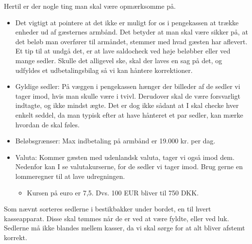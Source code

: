 Hertil er der nogle ting man skal være opmærksomme på.
\begin{itemize}
  \item Det vigtigt at pointere at det ikke er muligt for 
  os i pengekassen at trække enheder ud af gæsternes armbånd.
  Det betyder at man skal være sikker på, at det beløb man overfører til armåndet, 
  stemmer med hvad gæsten har aflevert. Et tip til at undgå det, er
  at lave saldocheck ved høje beløbber eller ved mange sedler.
  Skulle det alligevel ske, skal der laves en sag på det, og udfyldes et
  udbetalingsbilag så vi kan håntere korrektioner.
  \item Gyldige sedler: På væggen i pengekassen hænger der billeder af de sedler vi tager imod, 
  hvis man skulle være i tvivl. Derudover skal de være forsvarligt indtagte, og ikke mindst ægte. 
  Det er dog ikke sådant at I skal checke hver enkelt seddel, da man typisk efter at have 
  hånteret et par sedler, kan mærke hvordan de skal føles.
  \item Beløbsgrænser: Max indbetaling på armbånd er 19.000 kr. per dag.
  \item Valuta: Kommer gæsten med udenlandsk valuta, tager vi også imod dem. Nedenfor 
  kan I se valutakurserne, for de sedler vi tager imod. Brug gerne en lommeregner til 
  at lave udregningen.
  \begin{itemize}
    \item Kursen på euro er 7,5. Dvs. 100 EUR bliver til 750 DKK.
  \end{itemize}
\end{itemize}

Som nævnt sorteres sedlerne i bestikbakker under bordet, en til hvert kasseapparat. 
Disse skal tømmes når de er ved at være fyldte, eller ved luk. Sedlerne må ikke blandes mellem kasser, 
da vi skal sørge for at alt bliver afstemt korrekt.

